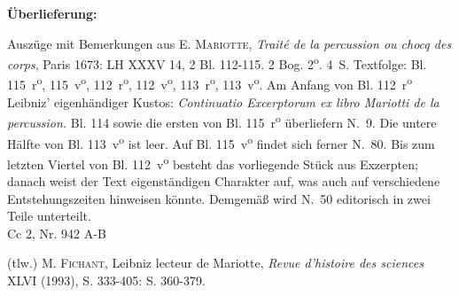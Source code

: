 \begin{ledgroupsized}[r]{120mm}
\footnotesize
\pstart
\noindent\textbf{\"{U}berlieferung:}
\pend
\end{ledgroupsized}
%
\begin{ledgroupsized}[r]{114mm}
\footnotesize
\pstart
\parindent -6mm
%
Auszüge mit Bemerkungen aus \cite{00311}E. \textsc{Mariotte}, \textit{Traité de la percussion ou chocq des corps}, Paris 1673:
LH XXXV 14, 2 Bl. 112-115. 2 Bog. 2\textsuperscript{o}.
4\, S. Textfolge: Bl. 115~r\textsuperscript{o}, 115~v\textsuperscript{o}, 112~r\textsuperscript{o}, 112~v\textsuperscript{o}, 113~r\textsuperscript{o}, 113~v\textsuperscript{o}.
Am Anfang von Bl. 112~r\textsuperscript{o} Leibniz' eigenhändiger Kustos: \textit{Continuatio Excerptorum ex libro Mariotti de la percussion.}
Bl. 114 sowie die ersten  von Bl. 115~r\textsuperscript{o} überliefern N.~9. %
Die untere Hälfte von Bl. 113~v\textsuperscript{o} ist leer.
Auf Bl. 115~v\textsuperscript{o} findet sich ferner N.~80. %
Bis zum letzten Viertel von Bl. 112~v\textsuperscript{o} besteht das vorliegende Stück aus Exzerpten;
danach weist der Text eigenständigen Charakter auf, was auch auf verschiedene Entstehungszeiten hinweisen könnte.
Demgemäß wird N.~50 %
editorisch in zwei Teile unterteilt.
\\Cc 2, Nr. 942 A-B
\pend
%
\begin{ledgroupsized}[r]{114mm}
\footnotesize
\pstart
\count{}
\count{}
\count{}
\parindent -6mm
%
(tlw.) \textsc{M. Fichant}, \glqq Leibniz lecteur de Mariotte\grqq, \textit{Revue d'histoire des sciences} XLVI (1993), S. 333-405: S. 360-379.\cite{01055}
\pend
\end{ledgroupsized}\end{ledgroupsized}
\vspace*{5mm}
